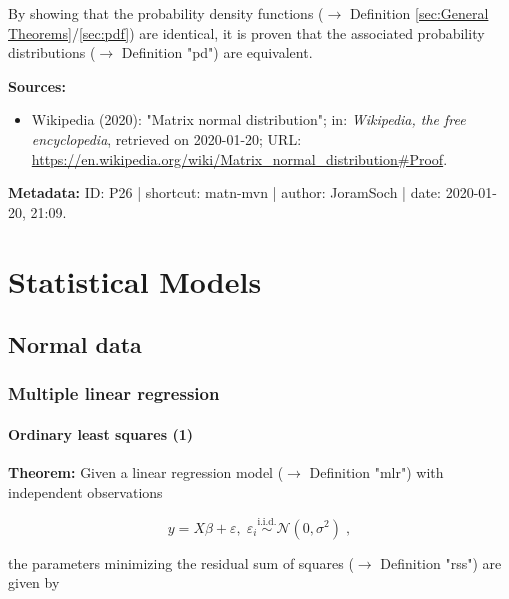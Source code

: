 \documentclass[a4paper,12pt]{book}
\begin{document}
By showing that the probability density functions ($\rightarrow$ Definition \ref{sec:General Theorems}/\ref{sec:pdf}) are identical, it is proven that the associated probability distributions ($\rightarrow$ Definition "pd") are equivalent.

\vspace{1em}
\textbf{Sources:}
\begin{itemize}
\item Wikipedia (2020): "Matrix normal distribution"; in: \textit{Wikipedia, the free encyclopedia}, retrieved on 2020-01-20; URL: \url{https://en.wikipedia.org/wiki/Matrix_normal_distribution#Proof}.
\end{itemize}


\vspace{1em}
\textbf{Metadata:} ID: P26 | shortcut: matn-mvn | author: JoramSoch | date: 2020-01-20, 21:09.




\chapter{Statistical Models} \label{sec:Statistical Models} \newpage

\pagebreak
\section{Normal data}

\subsection{Multiple linear regression}

\subsubsection[\textbf{Ordinary least squares (1)}]{Ordinary least squares (1)} \label{sec:mlr-ols}

\vspace{1em}
\textbf{Theorem:} Given a linear regression model ($\rightarrow$ Definition "mlr") with independent observations

\begin{equation} \label{eq:mlr-ols-MLR}
y = X\beta + \varepsilon, \; \varepsilon_i \overset{\mathrm{i.i.d.}}{\sim} \mathcal{N}(0, \sigma^2) \; ,
\end{equation}

the parameters minimizing the residual sum of squares ($\rightarrow$ Definition "rss") are given by
\end{document}
